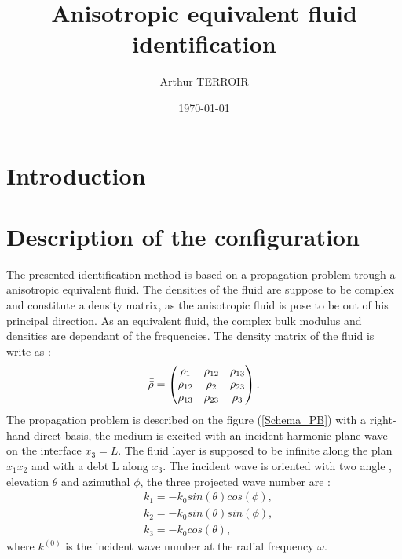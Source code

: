 \documentclass{article}
\title{Anisotropic equivalent fluid identification}
\author{Arthur TERROIR}
\date{\today}
\begin{document}
\maketitle

\section{Introduction}


\section{Description of the configuration}
    The presented identification method is based on a propagation problem trough a anisotropic equivalent fluid. The densities of the fluid are suppose to be complex and constitute a density matrix, as the anisotropic fluid is pose to be out of his principal direction. As an equivalent fluid, the complex bulk modulus and densities are dependant of the frequencies. The density matrix of the fluid is write as : 
    \begin{align}
        \Bar{\Bar{\rho}}=\begin{pmatrix}
    					\rho_{1} & \rho_{12} & \rho_{13} \\
                        \rho_{12} & \rho_{2} & \rho_{23} \\
                        \rho_{13} & \rho_{23} & \rho_{3}\end{pmatrix}\label{Density_tensor}.
    \end{align}
    The propagation problem is described on the figure (\ref{Schema_PB}) with a right-hand direct basis, the medium is excited with an incident harmonic plane wave on the interface $x_3=L$. The fluid layer is supposed to be infinite along the plan $x_1x_2$ and with a debt L along $x_3$. The incident wave is oriented with two angle , elevation $\theta$ and azimuthal $\phi$, the three projected wave number are :   
   \begin{align}
    &k_1=-k_0 sin(\theta) cos(\phi),\label{k1} \\
    &k_2=-k_0 sin(\theta) sin(\phi),\label{k2} \\
    &k_3= -k_0 cos(\theta),\label{k3}
    \end{align}
    where $k^{(0)}$ is the incident wave number at the radial frequency $\omega$. 
    
\end{document}
